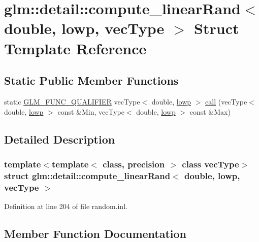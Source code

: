 \hypertarget{structglm_1_1detail_1_1compute__linear_rand_3_01double_00_01lowp_00_01vec_type_01_4}{}\section{glm\+::detail\+::compute\+\_\+linear\+Rand$<$ double, lowp, vec\+Type $>$ Struct Template Reference}
\label{structglm_1_1detail_1_1compute__linear_rand_3_01double_00_01lowp_00_01vec_type_01_4}
\subsection*{Static Public Member Functions}
\begin{DoxyCompactItemize}
\item 
static \mbox{\hyperlink{setup_8hpp_a33fdea6f91c5f834105f7415e2a64407}{G\+L\+M\+\_\+\+F\+U\+N\+C\+\_\+\+Q\+U\+A\+L\+I\+F\+I\+ER}} vec\+Type$<$ double, \mbox{\hyperlink{namespaceglm_a0f04f086094c747d227af4425893f545ae161af3fc695e696ce3bf69f7332bc2d}{lowp}} $>$ \mbox{\hyperlink{structglm_1_1detail_1_1compute__linear_rand_3_01double_00_01lowp_00_01vec_type_01_4_a87f42da70174985a5b6c772a0b540818}{call}} (vec\+Type$<$ double, \mbox{\hyperlink{namespaceglm_a0f04f086094c747d227af4425893f545ae161af3fc695e696ce3bf69f7332bc2d}{lowp}} $>$ const \&Min, vec\+Type$<$ double, \mbox{\hyperlink{namespaceglm_a0f04f086094c747d227af4425893f545ae161af3fc695e696ce3bf69f7332bc2d}{lowp}} $>$ const \&Max)
\end{DoxyCompactItemize}


\subsection{Detailed Description}
\subsubsection*{template$<$template$<$ class, precision $>$ class vec\+Type$>$\newline
struct glm\+::detail\+::compute\+\_\+linear\+Rand$<$ double, lowp, vec\+Type $>$}



Definition at line 204 of file random.\+inl.



\subsection{Member Function Documentation}
\mbox{\label{structglm_1_1detail_1_1compute__linear_rand_3_01double_00_01lowp_00_01vec_type_01_4_a87f42da70174985a5b6c772a0b540818}} 

